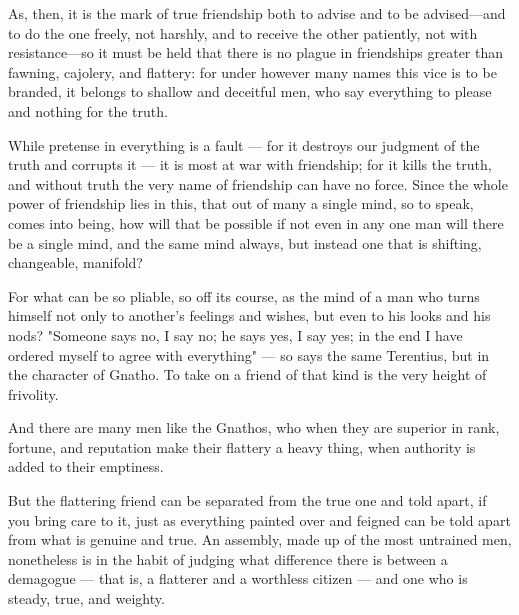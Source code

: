  As, then, it is the mark of true friendship both to advise and to be advised—and to do the one freely, not harshly, and to receive the other patiently, not with resistance—so it must be held that there is no plague in friendships greater than fawning, cajolery, and flattery: for under however many names this vice is to be branded, it belongs to shallow and deceitful men, who say everything to please and nothing for the truth.

 While pretense in everything is a fault — for it destroys our judgment of the truth and corrupts it — it is most at war with friendship; for it kills the truth, and without truth the very name of friendship can have no force. Since the whole power of friendship lies in this, that out of many a single mind, so to speak, comes into being, how will that be possible if not even in any one man will there be a single mind, and the same mind always, but instead one that is shifting, changeable, manifold?

 For what can be so pliable, so off its course, as the mind of a man who turns himself not only to another's feelings and wishes, but even to his looks and his nods? "Someone says no, I say no; he says yes, I say yes; in the end I have ordered myself to agree with everything" — so says the same Terentius, but in the character of Gnatho. To take on a friend of that kind is the very height of frivolity.

 And there are many men like the Gnathos, who when they are superior in rank, fortune, and reputation make their flattery a heavy thing, when authority is added to their emptiness.

 But the flattering friend can be separated from the true one and told apart, if you bring care to it, just as everything painted over and feigned can be told apart from what is genuine and true. An assembly, made up of the most untrained men, nonetheless is in the habit of judging what difference there is between a demagogue — that is, a flatterer and a worthless citizen — and one who is steady, true, and weighty.

